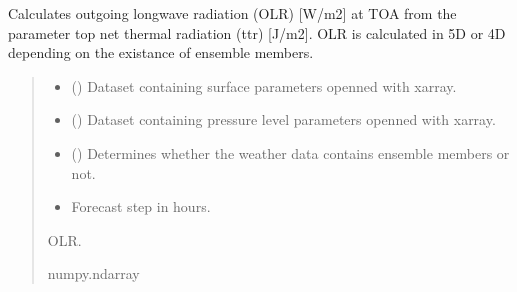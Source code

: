 \documentclass[a4paper,11pt,english]{sphinxmanual}
\begin{document}

\begin{fulllineitems}
\label{\detokenize{modules:climaccf.processing_surf_vars.get_olr}}
\pysigstartsignatures
{}
\pysigstopsignatures
\sphinxAtStartPar
Calculates outgoing longwave radiation (OLR) {[}W/m2{]} at TOA from the parameter top net thermal radiation (ttr)
{[}J/m2{]}. OLR is calculated in 5D or 4D depending on the existance of ensemble members.
\begin{quote}\begin{description}
\begin{itemize}
\item {} 
\sphinxAtStartPar
{} () \textendash{} Dataset containing surface parameters openned with xarray.

\item {} 
\sphinxAtStartPar
{} () \textendash{} Dataset containing pressure level parameters openned with xarray.

\item {} 
\sphinxAtStartPar
{} () \textendash{} Determines whether the weather data contains ensemble members or not.

\item {} 
\sphinxAtStartPar
{} \textendash{} Forecast step in hours.

\end{itemize}

\sphinxAtStartPar
OLR.

\sphinxAtStartPar
numpy.ndarray

\end{description}\end{quote}

\end{fulllineitems}
\end{document}
